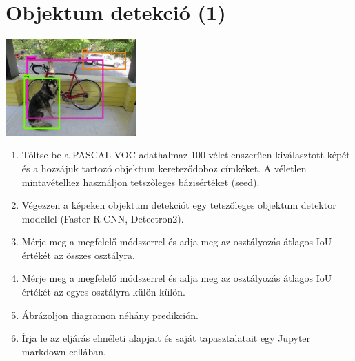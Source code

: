 \documentclass[english]{article}
\begin{document}
\section{Objektum detekció (1)}
\begin{center}
\includegraphics[width=5cm, keepaspectratio]{images/object_detection.png}
\end{center}
\begin{enumerate}
	\item Töltse be a PASCAL VOC adathalmaz 100 véletlenszerűen kiválasztott képét és a hozzájuk tartozó objektum kereteződoboz címkéket. A véletlen mintavételhez használjon tetszőleges bázisértéket (seed).
	\item Végezzen a képeken objektum detekciót egy tetszőleges objektum detektor modellel (Faster R-CNN, Detectron2).
	\item Mérje meg a megfelelő módszerrel és adja meg az osztályozás átlagos IoU értékét az összes osztályra. 
	\item Mérje meg a megfelelő módszerrel és adja meg az osztályozás átlagos IoU értékét az egyes osztályra külön-külön.
	\item Ábrázoljon diagramon néhány predikción.
	\item Írja le az eljárás elméleti alapjait és saját tapasztalatait egy Jupyter markdown cellában.
\end{enumerate}
\end{document}
